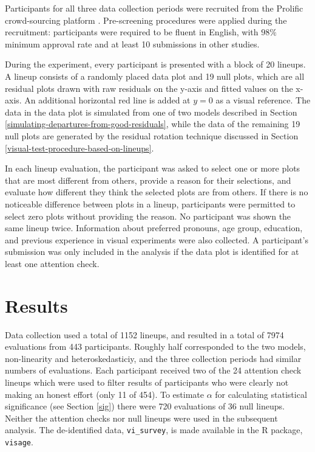 \documentclass[]{interact}
\theoremstyle{plain}%
\theoremstyle{definition}
\theoremstyle{remark}
\begin{document}
Participants for all three data collection periods were recruited from
the Prolific crowd-sourcing platform \citep{palan2018prolific}.
Pre-screening procedures were applied during the recruitment:
participants were required to be fluent in English, with \(98\%\)
minimum approval rate and at least 10 submissions in other studies.

During the experiment, every participant is presented with a block of 20
lineups. A lineup consists of a randomly placed data plot and 19 null
plots, which are all residual plots drawn with raw residuals on the
y-axis and fitted values on the x-axis. An additional horizontal red
line is added at \(y = 0\) as a visual reference. The data in the data
plot is simulated from one of two models described in Section
\ref{simulating-departures-from-good-residuals}, while the data of the
remaining 19 null plots are generated by the residual rotation technique
discussed in Section \ref{visual-test-procedure-based-on-lineups}.

In each lineup evaluation, the participant was asked to select one or
more plots that are most different from others, provide a reason for
their selections, and evaluate how different they think the selected
plots are from others. If there is no noticeable difference between
plots in a lineup, participants were permitted to select zero plots
without providing the reason. No participant was shown the same lineup
twice. Information about preferred pronouns, age group, education, and
previous experience in visual experiments were also collected. A
participant's submission was only included in the analysis if the data
plot is identified for at least one attention check.

\hypertarget{results}{%
\section{Results}\label{results}}

Data collection used a total of 1152 lineups, and resulted in a total of
7974 evaluations from 443 participants. Roughly half corresponded to the
two models, non-linearity and heteroskedasticiy, and the three
collection periods had similar numbers of evaluations. Each participant
received two of the 24 attention check lineups which were used to filter
results of participants who were clearly not making an honest effort
(only 11 of 454). To estimate \(\alpha\) for calculating statistical
significance (see Section \ref{sig}) there were 720 evaluations of 36
null lineups. Neither the attention checks nor null lineups were used in
the subsequent analysis. The de-identified data, \texttt{vi\_survey}, is
made available in the R package, \texttt{visage}.
\end{document}
